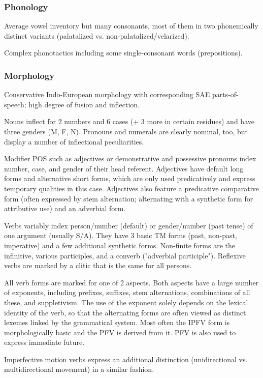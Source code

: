 \documentclass[a4paper, 11pt]{book}
\begin{document}

\subsubsection*{Phonology}

\begin{itemize*}
\item Average vowel inventory but many consonants, most of them in two phonemically distinct variants (palatalized vs. non-palatalized/velarized).
\item Complex phonotactics including some single-consonant words (prepositions). 
\end{itemize*}

\subsubsection*{Morphology}

\begin{itemize*}
\item Conservative Indo-European morphology with corresponding SAE parts-of-speech; high degree of fusion and inflection. 
\item Nouns inflect for 2 numbers and 6 cases (+ 3 more in certain residues) and have three genders (M, F, N). Pronouns and numerals are clearly nominal, too, but display a number of inflectional peculiarities. 
\item Modifier POS such as adjectives or demonstrative and possessive pronouns index number, case, and gender of their head referent. Adjectives have default long forms and alternative short forms, which are only used predicatively and express temporary qualities in this case. Adjectives also feature a predicative comparative form (often expressed by stem alternation; alternating with a synthetic form for attributive use) and an adverbial form. 
\item Verbs variably index person/number (default) or gender/number (past tense) of one argument (usually S/A). They have 3 basic TM forms (past, non-past, imperative) and a few additional synthetic forms. Non-finite forms are the infinitive, various participles, and a converb ("adverbial participle"). Reflexive verbs are marked by a clitic that is the same for all persons.  
\item All verb forms are marked for one of 2 aspects. Both aspects have a large number of exponents, including prefixes, suffixes, stem alternations, combinations of all these, and suppletivism. The use of the exponent solely depends on the lexical identity of the verb, so that the alternating forms are often viewed as distinct lexemes linked by the grammatical system. Most often the IPFV form is morphologically basic and the PFV is derived from it. PFV is also used to express immediate future. 
\item Imperfective motion verbs express an additional distinction (unidirectional vs. multidirectional movement) in a similar fashion. 
\end{itemize*}
\end{document}
